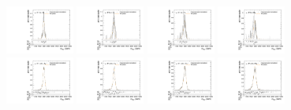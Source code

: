 \begin{figure}[htpb]
  \centering
  \includegraphics[width=0.2\textwidth]{fig/2Dfit/templateVsReco_RadToWW2000_r0_MVV_mu_HP_bb_LDy_linear.pdf}
  \includegraphics[width=0.2\textwidth]{fig/2Dfit/templateVsReco_RadToWW2000_r0_MVV_mu_LP_bb_LDy_linear.pdf}
  \includegraphics[width=0.2\textwidth]{fig/2Dfit/templateVsReco_RadToWW2000_r0_MVV_mu_HP_bb_HDy_linear.pdf}
  \includegraphics[width=0.2\textwidth]{fig/2Dfit/templateVsReco_RadToWW2000_r0_MVV_mu_LP_bb_HDy_linear.pdf}\\
  \includegraphics[width=0.2\textwidth]{fig/2Dfit/templateVsReco_RadToWW2000_r0_MVV_mu_HP_nobb_LDy_linear.pdf}
  \includegraphics[width=0.2\textwidth]{fig/2Dfit/templateVsReco_RadToWW2000_r0_MVV_mu_LP_nobb_LDy_linear.pdf}
  \includegraphics[width=0.2\textwidth]{fig/2Dfit/templateVsReco_RadToWW2000_r0_MVV_mu_HP_nobb_HDy_linear.pdf}
  \includegraphics[width=0.2\textwidth]{fig/2Dfit/templateVsReco_RadToWW2000_r0_MVV_mu_LP_nobb_HDy_linear.pdf}\\

\end{figure}
